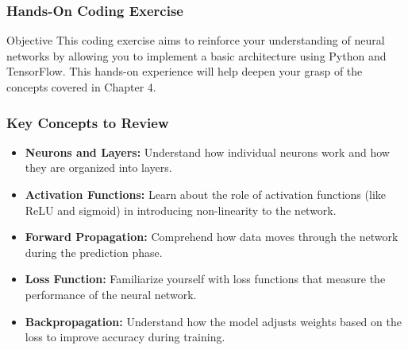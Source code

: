 \documentclass[aspectratio=169]{beamer}
\begin{document}
\begin{frame}
    \frametitle{Hands-On Coding Exercise}
    \begin{block}{Objective}
        This coding exercise aims to reinforce your understanding of neural networks by allowing you to implement a basic architecture using Python and TensorFlow.
        This hands-on experience will help deepen your grasp of the concepts covered in Chapter 4.
    \end{block}
\end{frame}

\begin{frame}
    \frametitle{Key Concepts to Review}
    \begin{itemize}
        \item \textbf{Neurons and Layers:} Understand how individual neurons work and how they are organized into layers.
        \item \textbf{Activation Functions:} Learn about the role of activation functions (like ReLU and sigmoid) in introducing non-linearity to the network.
        \item \textbf{Forward Propagation:} Comprehend how data moves through the network during the prediction phase.
        \item \textbf{Loss Function:} Familiarize yourself with loss functions that measure the performance of the neural network.
        \item \textbf{Backpropagation:} Understand how the model adjusts weights based on the loss to improve accuracy during training.
    \end{itemize}
\end{frame}
\end{document}
